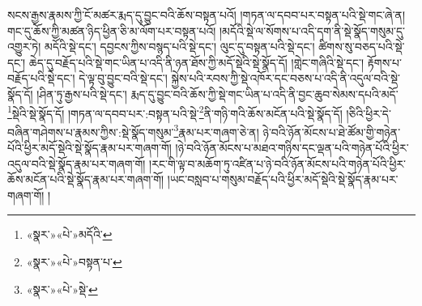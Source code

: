 སངས་རྒྱས་རྣམས་ཀྱི་ངོ་མཚར་རྨད་དུ་བྱུང་བའི་ཆོས་བསྟན་པའོ། །གཏན་ལ་དབབ་པར་བསྟན་པའི་སྡེ་གང་ཞེ་ན། གང་དུ་ཆོས་ཀྱི་མཚན་ཉིད་ཕྱིན་ཅི་མ་ལོག་པར་བསྟན་པའོ། །མདོའི་སྡེ་ལ་སོགས་པ་འདི་དག་ནི་སྡེ་སྣོད་གསུམ་དུ་འགྱུར་ཏེ། མདོའི་སྡེ་དང་། དབྱངས་ཀྱིས་བསྙད་པའི་སྡེ་དང་། ལུང་དུ་བསྟན་པའི་སྡེ་དང་། ཚིགས་སུ་བཅད་པའི་སྡེ་དང་། ཆེད་དུ་བརྗོད་པའི་སྡེ་གང་ཡིན་པ་འདི་ནི་ཉན་ཐོས་ཀྱི་མདོ་སྡེའི་སྡེ་སྣོད་དོ། །གླེང་གཞིའི་སྡེ་དང་། རྟོགས་པ་བརྗོད་པའི་སྡེ་དང་། དེ་ལྟ་བུ་བྱུང་བའི་སྡེ་དང་། སྐྱེས་པའི་རབས་ཀྱི་སྡེ་འཁོར་དང་བཅས་པ་འདི་ནི་འདུལ་བའི་སྡེ་སྣོད་དོ། །ཤིན་ཏུ་རྒྱས་པའི་སྡེ་དང་། རྨད་དུ་བྱུང་བའི་ཆོས་ཀྱི་སྡེ་གང་ཡིན་པ་འདི་ནི་བྱང་ཆུབ་སེམས་དཔའི་མདོ་\footnote{«སྣར་»«པེ་»མདོའི་}སྡེའི་སྡེ་སྣོད་དོ། །གཏན་ལ་དབབ་པར་:བསྟན་པའི་སྡེ་\footnote{«སྣར་»«པེ་»བསྟན་པ་}ནི་གཉི་གའི་ཆོས་མངོན་པའི་སྡེ་སྣོད་དོ། །ཅིའི་ཕྱིར་དེ་བཞིན་གཤེགས་པ་རྣམས་ཀྱིས་:སྡེ་སྣོད་གསུམ་\footnote{«སྣར་»«པེ་»སྡེ་}རྣམ་པར་གཞག་ཅེ་ན། ཉེ་བའི་ཉོན་མོངས་པ་ཐེ་ཚོམ་གྱི་གཉེན་པོའི་ཕྱིར་མདོ་སྡེའི་སྡེ་སྣོད་རྣམ་པར་གཞག་གོ། །ཉེ་བའི་ཉོན་མོངས་པ་མཐའ་གཉིས་དང་ལྡན་པའི་གཉེན་པོའི་ཕྱིར་འདུལ་བའི་སྡེ་སྣོད་རྣམ་པར་གཞག་གོ། །རང་གི་ལྟ་བ་མཆོག་ཏུ་འཛིན་པ་ཉེ་བའི་ཉོན་མོངས་པའི་གཉེན་པོའི་ཕྱིར་ཆོས་མངོན་པའི་སྡེ་སྣོད་རྣམ་པར་གཞག་གོ། །ཡང་བསླབ་པ་གསུམ་བརྗོད་པའི་ཕྱིར་མདོ་སྡེའི་སྡེ་སྣོད་རྣམ་པར་གཞག་གོ། །
